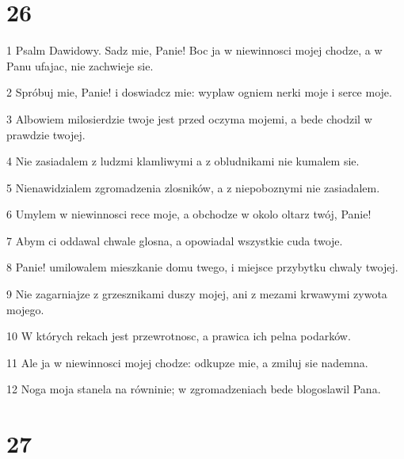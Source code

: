 \chapter{26}

\par 1 Psalm Dawidowy. Sadz mie, Panie! Boc ja w niewinnosci mojej chodze, a w Panu ufajac, nie zachwieje sie.
\par 2 Spróbuj mie, Panie! i doswiadcz mie: wyplaw ogniem nerki moje i serce moje.
\par 3 Albowiem milosierdzie twoje jest przed oczyma mojemi, a bede chodzil w prawdzie twojej.
\par 4 Nie zasiadalem z ludzmi klamliwymi a z obludnikami nie kumalem sie.
\par 5 Nienawidzialem zgromadzenia zlosników, a z niepoboznymi nie zasiadalem.
\par 6 Umylem w niewinnosci rece moje, a obchodze w okolo oltarz twój, Panie!
\par 7 Abym ci oddawal chwale glosna, a opowiadal wszystkie cuda twoje.
\par 8 Panie! umilowalem mieszkanie domu twego, i miejsce przybytku chwaly twojej.
\par 9 Nie zagarniajze z grzesznikami duszy mojej, ani z mezami krwawymi zywota mojego.
\par 10 W których rekach jest przewrotnosc, a prawica ich pelna podarków.
\par 11 Ale ja w niewinnosci mojej chodze: odkupze mie, a zmiluj sie nademna.
\par 12 Noga moja stanela na równinie; w zgromadzeniach bede blogoslawil Pana.

\chapter{27}

